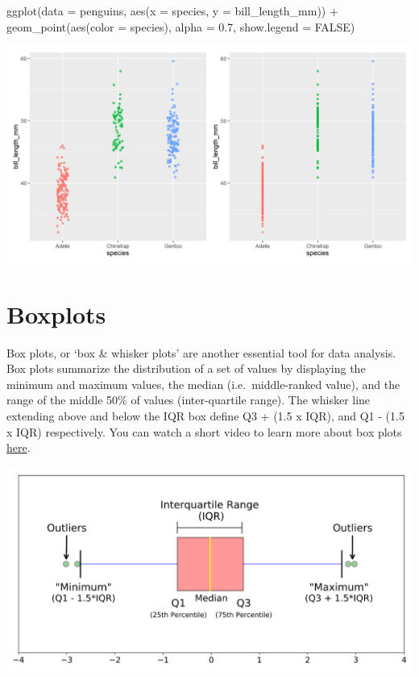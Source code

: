 \documentclass[
]{book}
\newenvironment{Shaded}{\begin{snugshade}}{\end{snugshade}}
\newcommand{\AttributeTok}[1]{\textcolor[rgb]{0.77,0.63,0.00}{#1}}
\newcommand{\ConstantTok}[1]{\textcolor[rgb]{0.00,0.00,0.00}{#1}}
\newcommand{\FloatTok}[1]{\textcolor[rgb]{0.00,0.00,0.81}{#1}}
\newcommand{\FunctionTok}[1]{\textcolor[rgb]{0.00,0.00,0.00}{#1}}
\newcommand{\NormalTok}[1]{#1}
\newcommand{\SpecialCharTok}[1]{\textcolor[rgb]{0.00,0.00,0.00}{#1}}
\begin{document}
\begin{Shaded}
\begin{Highlighting}[]
\FunctionTok{ggplot}\NormalTok{(}\AttributeTok{data =}\NormalTok{ penguins, }\FunctionTok{aes}\NormalTok{(}\AttributeTok{x =}\NormalTok{ species, }\AttributeTok{y =}\NormalTok{ bill\_length\_mm)) }\SpecialCharTok{+}
  \FunctionTok{geom\_point}\NormalTok{(}\FunctionTok{aes}\NormalTok{(}\AttributeTok{color =}\NormalTok{ species),}
              \AttributeTok{alpha =} \FloatTok{0.7}\NormalTok{, }
              \AttributeTok{show.legend =} \ConstantTok{FALSE}\NormalTok{) }
\end{Highlighting}
\end{Shaded}

\includegraphics[width=0.8\linewidth]{images/jitter}

\hypertarget{boxplots}{%
\section{Boxplots}\label{boxplots}}

Box plots, or `box \& whisker plots' are another essential tool for data analysis. Box plots summarize the distribution of a set of values by displaying the minimum and maximum values, the median (i.e.~middle-ranked value), and the range of the middle 50\% of values (inter-quartile range).
The whisker line extending above and below the IQR box define Q3 + (1.5 x IQR), and Q1 - (1.5 x IQR) respectively. You can watch a short video to learn more about box plots \href{https://www.youtube.com/watch?v=fHLhBnmwUM0}{here}.

\includegraphics[width=0.8\linewidth]{images/boxplot}
\end{document}
